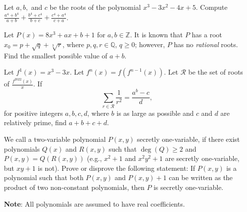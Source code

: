 \documentclass[11pt]{article}
\theoremstyle{definition}
\begin{document}
%	



\begin{question}[name={2022 Stanford Math Tournament, \href{https://artofproblemsolving.com/community/c4h2874565p25539362}{Team Round \#5}}]
	Let $a, b,$ and $c$ be the roots of the polynomial $x^3 - 3x^2 - 4x + 5$. Compute $\frac{a^4 + b^4}{a + b}+\frac{b^4 + c^4}{b + c}+\frac{c^4 + a^4}{c + a}$.
\end{question}



%	


\begin{question}[name={2022 Stanford Math Tournament, \href{https://artofproblemsolving.com/community/c383h3040303p27371394}{Algebra \#9}}]
	Let $P(x)=8x^3+ax+b+1$ for $a,b\in\mathbb{Z}$. It is known that $P$ has a root $x_0=p+\sqrt{q}+\sqrt[3]{r}$, where $p,q,r\in\mathbb{Q}$, $q\ge0$; however, $P$ has no \textit{rational} roots. Find the smallest possible value of $a+b$.	
\end{question}



%	




\begin{question}[name={2022 Stanford Math Tournament, \href{https://artofproblemsolving.com/community/c383h3040320p27371581}{Algebra \#10}}]
	Let $f^1(x)=x^3-3x$. Let $f^n(x)=f(f^{n-1}(x))$. Let $\mathcal{R}$ be the set of roots of $\tfrac{f^{2022}(x)}{x}$. If
	\[\sum_{r\in\mathcal{R}}\frac{1}{r^2}=\frac{a^b-c}{d},\]for positive integers $a,b,c,d$, where $b$ is as large as possible and $c$ and $d$ are relatively prime, find $a+b+c+d$.
\end{question}



%	



\begin{question}[name={2022 Baltic Way, \href{https://artofproblemsolving.com/community/c6h2959346p26504199}{Problem 3}}]
	We call a two-variable polynomial $P(x, y)$ secretly one-variable, if there exist polynomials $Q(x)$ and $R(x, y)$ such that $\deg(Q) \ge 2$ and $P(x, y) = Q(R(x, y))$ (e.g., $x^2 + 1$ and $x^2y^2 +1$ are secretly one-variable, but $xy + 1$ is not). Prove or disprove the following statement: If $P(x, y)$ is a polynomial such that both $P(x, y)$ and $P(x, y) + 1$ can be written as the product of two non-constant polynomials, then $P$ is secretly one-variable.
	
	\textbf{Note}: All polynomials are assumed to have real coefficients.
\end{question}
\end{document}
